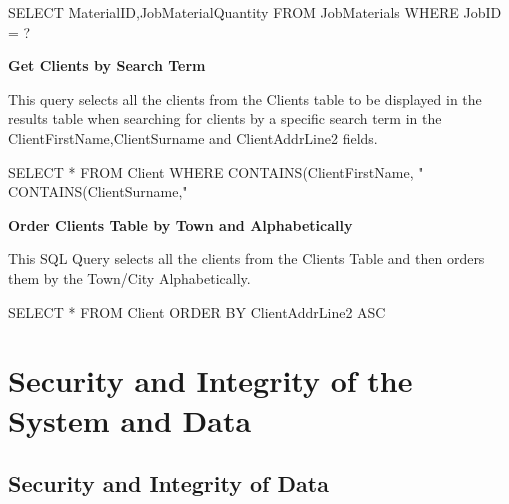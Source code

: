 \begin{sql}
SELECT MaterialID,JobMaterialQuantity FROM JobMaterials WHERE JobID = ? 
\end{sql}


\textbf{Get Clients by Search Term}
\begin{flushleft}
This query selects all the clients from the Clients table to be displayed in the results table when searching for clients by a specific search term in the ClientFirstName,ClientSurname and ClientAddrLine2 fields.
\begin{sql}
SELECT * FROM Client WHERE CONTAINS(ClientFirstName, "%
CONTAINS(ClientSurname,"%
\end{sql}
\end{flushleft}

\textbf{Order Clients Table by Town and Alphabetically}
\begin{flushleft}
This SQL Query selects all the clients from the Clients Table and then orders them by the Town/City Alphabetically.
\begin{sql}
SELECT * FROM Client ORDER BY ClientAddrLine2 ASC    
\end{sql}
\end{flushleft}

\section{Security and Integrity of the System and Data}

\subsection{Security and Integrity of Data}

